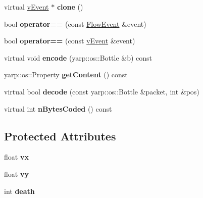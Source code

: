 \begin{DoxyCompactItemize}
\item 
virtual \hyperlink{classev_1_1vEvent}{v\+Event} $\ast$ {\bfseries clone} ()\hypertarget{classev_1_1FlowEvent_a9a1c52800ba95d9392026c42b153ee24}{}\label{classev_1_1FlowEvent_a9a1c52800ba95d9392026c42b153ee24}

\item 
bool {\bfseries operator==} (const \hyperlink{classev_1_1FlowEvent}{Flow\+Event} \&event)\hypertarget{classev_1_1FlowEvent_a85fb93e32e94718e5fb6a14bd85417e2}{}\label{classev_1_1FlowEvent_a85fb93e32e94718e5fb6a14bd85417e2}

\item 
bool {\bfseries operator==} (const \hyperlink{classev_1_1vEvent}{v\+Event} \&event)\hypertarget{classev_1_1FlowEvent_a29815a0c3a40e93c1b3087c29eb8b522}{}\label{classev_1_1FlowEvent_a29815a0c3a40e93c1b3087c29eb8b522}

\item 
virtual void {\bfseries encode} (yarp\+::os\+::\+Bottle \&b) const \hypertarget{classev_1_1FlowEvent_a13c900d7027a67d8197e32d56e92e0b0}{}\label{classev_1_1FlowEvent_a13c900d7027a67d8197e32d56e92e0b0}

\item 
yarp\+::os\+::\+Property {\bfseries get\+Content} () const \hypertarget{classev_1_1FlowEvent_a299486f89e1f893a513d237fd70ba00c}{}\label{classev_1_1FlowEvent_a299486f89e1f893a513d237fd70ba00c}

\item 
virtual bool {\bfseries decode} (const yarp\+::os\+::\+Bottle \&packet, int \&pos)\hypertarget{classev_1_1FlowEvent_a47a44a03752d3d0b5de668bfa8092d43}{}\label{classev_1_1FlowEvent_a47a44a03752d3d0b5de668bfa8092d43}

\item 
virtual int {\bfseries n\+Bytes\+Coded} () const \hypertarget{classev_1_1FlowEvent_a429953b6b4b849347295346a36950ce7}{}\label{classev_1_1FlowEvent_a429953b6b4b849347295346a36950ce7}

\end{DoxyCompactItemize}
\subsection*{Protected Attributes}
\begin{DoxyCompactItemize}
\item 
float {\bfseries vx}\hypertarget{classev_1_1FlowEvent_a614490d12ab9767e546e2929a4c7a65e}{}\label{classev_1_1FlowEvent_a614490d12ab9767e546e2929a4c7a65e}

\item 
float {\bfseries vy}\hypertarget{classev_1_1FlowEvent_a20416e333c9f0258a2a1bbb49fb14989}{}\label{classev_1_1FlowEvent_a20416e333c9f0258a2a1bbb49fb14989}

\item 
int {\bfseries death}\hypertarget{classev_1_1FlowEvent_ae6b074315c90ad3e1fbc8a6d76cbdcbe}{}\label{classev_1_1FlowEvent_ae6b074315c90ad3e1fbc8a6d76cbdcbe}

\end{DoxyCompactItemize}


